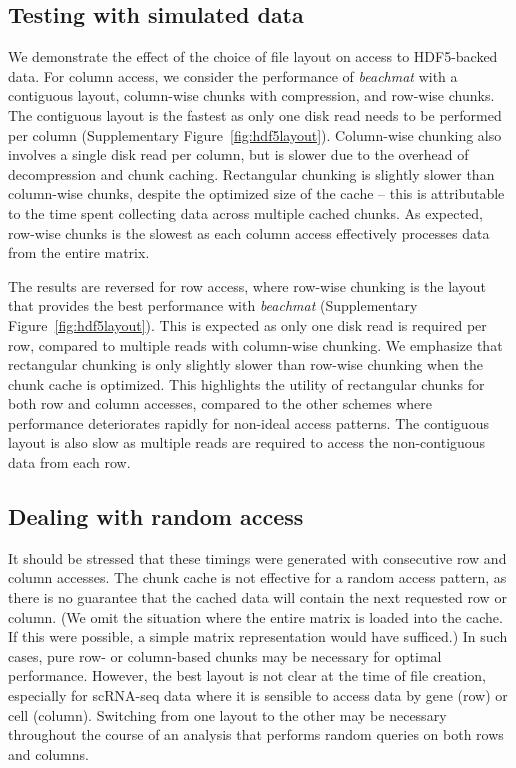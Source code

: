 \documentclass{article}
\newcommand{\beachmat}{\textit{beachmat}}
\begin{document}
\subsection{Testing with simulated data}
We demonstrate the effect of the choice of file layout on access to HDF5-backed data.
For column access, we consider the performance of \beachmat{} with a contiguous layout, column-wise chunks with compression, and row-wise chunks.
The contiguous layout is the fastest as only one disk read needs to be performed per column (Supplementary Figure~\ref{fig:hdf5layout}).
Column-wise chunking also involves a single disk read per column, but is slower due to the overhead of decompression and chunk caching.
Rectangular chunking is slightly slower than column-wise chunks, despite the optimized size of the cache -- this is attributable to the time spent collecting data across multiple cached chunks.
As expected, row-wise chunks is the slowest as each column access effectively processes data from the entire matrix.

The results are reversed for row access, where row-wise chunking is the layout that provides the best performance with \beachmat{} (Supplementary Figure~\ref{fig:hdf5layout}).
This is expected as only one disk read is required per row, compared to multiple reads with column-wise chunking.
We emphasize that rectangular chunking is only slightly slower than row-wise chunking when the chunk cache is optimized.
This highlights the utility of rectangular chunks for both row and column accesses, compared to the other schemes where performance deteriorates rapidly for non-ideal access patterns.
The contiguous layout is also slow as multiple reads are required to access the non-contiguous data from each row.

\subsection{Dealing with random access}
\label{sec:random}

It should be stressed that these timings were generated with consecutive row and column accesses.
The chunk cache is not effective for a random access pattern, as there is no guarantee that the cached data will contain the next requested row or column.
(We omit the situation where the entire matrix is loaded into the cache.
If this were possible, a simple matrix representation would have sufficed.)
In such cases, pure row- or column-based chunks may be necessary for optimal performance.
However, the best layout is not clear at the time of file creation, especially for scRNA-seq data where it is sensible to access data by gene (row) or cell (column).
Switching from one layout to the other may be necessary throughout the course of an analysis that performs random queries on both rows and columns.
\end{document}
